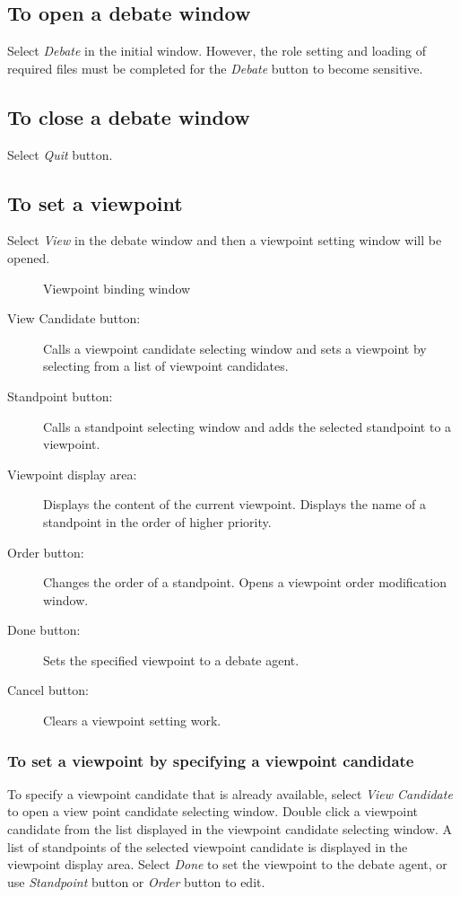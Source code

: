 \subsection{To open a debate window}
Select {\sl Debate} in the initial window.
However, the role setting and loading of required files must be completed for the {\sl Debate} button to become sensitive.

\subsection{To close a debate window}
Select {\sl Quit} button.

\subsection{To set a viewpoint}\label{To set a viewpoint}
Select {\sl View} in the debate window and then a viewpoint setting window will be opened.

\begin{figure}[htb]
\begin{center}
\end{center}
\caption{Viewpoint binding window}\label{Viewpoint binding window}
\end{figure}

\begin{description}

\item[View Candidate button:] Calls a viewpoint candidate selecting window and sets a viewpoint by selecting from a list of viewpoint candidates.
\item[Standpoint button:] Calls a standpoint selecting window and adds the selected standpoint to a viewpoint.
\item[Viewpoint display area:] Displays the content of the current viewpoint.
Displays the name of a standpoint in the order of higher priority.
\item[Order button:] Changes the order of a standpoint.
Opens a viewpoint order modification window.
\item[Done button:] Sets the specified viewpoint to a debate agent.
\item[Cancel button:] Clears a viewpoint setting work.
\end{description}

\subsubsection{To set a viewpoint by specifying a viewpoint candidate}
To specify a viewpoint candidate that is already available, select {\sl View Candidate} to open a view point candidate selecting window.
Double click a viewpoint candidate from the list displayed in the viewpoint candidate selecting window.
A list of standpoints of the selected viewpoint candidate is displayed in the viewpoint display area.
Select {\sl Done} to set the viewpoint to the debate agent, or use {\sl Standpoint} button or {\sl Order} button to edit.

